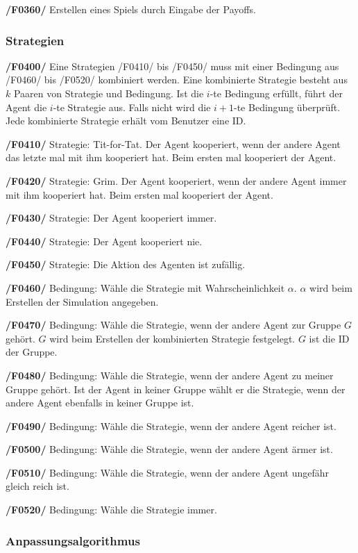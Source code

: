 \textbf{/F0360/} 
Erstellen eines Spiels durch Eingabe der Payoffs.

\subsubsection{Strategien}

\textbf{/F0400/}
Eine Strategien /F0410/ bis /F0450/ muss mit einer Bedingung aus /F0460/ bis /F0520/ kombiniert werden. Eine kombinierte Strategie besteht aus $k$ Paaren von Strategie und Bedingung. Ist die $i$-te Bedingung erfüllt, führt der Agent die $i$-te Strategie aus. Falls nicht wird die $i+1$-te Bedingung überprüft. Jede kombinierte Strategie erhält vom Benutzer eine ID.

\textbf{/F0410/} 
Strategie: Tit-for-Tat. Der Agent kooperiert, wenn der andere Agent das letzte mal mit ihm kooperiert hat. Beim ersten mal kooperiert der Agent.

\textbf{/F0420/} 
Strategie: Grim. Der Agent kooperiert, wenn der andere Agent immer mit ihm kooperiert hat. Beim ersten mal kooperiert der Agent.

\textbf{/F0430/} 
Strategie: Der Agent kooperiert immer.

\textbf{/F0440/}
Strategie: Der Agent kooperiert nie.

\textbf{/F0450/}
Strategie: Die Aktion des Agenten ist zufällig.

\textbf{/F0460/}
Bedingung: Wähle die Strategie mit Wahrscheinlichkeit $\alpha$. $\alpha$ wird beim Erstellen der Simulation angegeben.

\textbf{/F0470/}
Bedingung: Wähle die Strategie, wenn der andere Agent zur Gruppe $G$ gehört. $G$ wird beim Erstellen der kombinierten Strategie festgelegt. $G$ ist die ID der Gruppe.

\textbf{/F0480/}
Bedingung: Wähle die Strategie, wenn der andere Agent zu meiner Gruppe gehört. Ist der Agent in keiner Gruppe wählt er die Strategie, wenn der andere Agent ebenfalls in keiner Gruppe ist.

\textbf{/F0490/}
Bedingung: Wähle die Strategie, wenn der andere Agent reicher ist.

\textbf{/F0500/}
Bedingung: Wähle die Strategie, wenn der andere Agent ärmer ist.

\textbf{/F0510/}
Bedingung: Wähle die Strategie, wenn der andere Agent ungefähr gleich reich ist.

\textbf{/F0520/}
Bedingung: Wähle die Strategie immer.

\subsubsection{Anpassungsalgorithmus}

